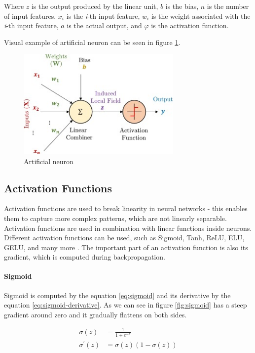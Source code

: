 Where $z$ is the output produced by the linear unit, $b$ is the bias, $n$ is the number of input features, $x_i$ is the \textit{i}-th input feature, $w_i$ is the weight associated with the \textit{i}-th input feature, $a$ is the actual output, and $\varphi$ is the activation function.

Visual example of artificial neuron can be seen in figure \ref{fig:artificial-neuron}.

\begin{figure}[H]
\begin{centering}
\includegraphics[width=8cm]{assets/images/neuron.jpg}
\par\end{centering}
\caption{Artificial neuron \cite{Santosh2022-1}}
\label{fig:artificial-neuron}
\end{figure}

\subsection{Activation Functions}
Activation functions are used to break linearity in neural networks - this enables them to capture more complex patterns, which are not linearly separable. Activation functions are used in combination with linear functions inside neurons. Different activation functions can be used, such as Sigmoid, Tanh, ReLU, ELU, GELU, and many more \cite{Dubey2022, Aby2025}.  The important part of an activation function is also its gradient, which is computed during backpropagation. 

\paragraph{Sigmoid}
Sigmoid is computed by the equation \ref{eq:sigmoid} and its derivative by the equation \ref{eq:sigmoid-derivative}. As we can see in figure \ref{fig:sigmoid} has a steep gradient around zero and it gradually flattens on both sides.

\begin{align}
\label{eq:sigmoid}
    \sigma(z) &= \frac{1}{1+e^{-z}} \\
\label{eq:sigmoid-derivative}
    \sigma^{'}(z) &= \sigma(z)(1-\sigma(z))
\end{align}

